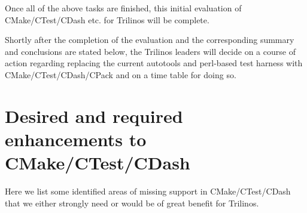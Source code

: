 \documentclass[pdf,ps2pdf,11pt]{SANDreport}
\begin{document}
Once all of the above tasks are finished, this initial evaluation of
CMake/CTest/CDash etc. for Trilinos will be complete.

Shortly after the completion of the evaluation and the corresponding
summary and conclusions are stated below, the Trilinos leaders will
decide on a course of action regarding replacing the current autotools
and perl-based test harness with CMake/CTest/CDash/CPack and on a time
table for doing so.

%
\section{Desired and required enhancements to CMake/CTest/CDash}
%

Here we list some identified areas of missing support in
CMake/CTest/CDash that we either strongly need or would be of great
benefit for Trilinos.
\end{document}
